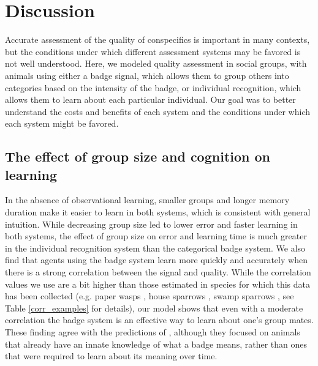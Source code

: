\section*{Discussion}
Accurate assessment of the quality of conspecifics is important in many contexts, but the conditions under which different assessment systems may be favored is not well understood. Here, we modeled quality assessment in social groups, with animals using either a badge signal, which allows them to group others into categories based on the intensity of the badge, or individual recognition, which allows them to learn about each particular individual. Our goal was to better understand the costs and benefits of each system and the conditions under which each system might be favored. 

\subsection*{The effect of group size and cognition on learning} 

In the absence of observational learning, smaller groups and longer memory duration make it easier to learn in both systems, which is consistent with general intuition. While decreasing group size led to lower error and faster learning in both systems, the effect of group size on error and learning time is much greater in the individual recognition system than the categorical badge system. We also find that agents using the badge system learn more quickly and accurately when there is a strong correlation between the signal and quality. While the correlation values we use are a bit higher than those estimated in species for which this data has been collected (e.g. paper wasps \citep{Tibbetts:2004kx}, house sparrows \citep{Veiga:1993fk}, swamp sparrows \citep{Olsen:2010uq}, see Table \ref{corr_examples} for details), our model shows that even with a moderate correlation the badge system is an effective way to learn about one's group mates. These finding agree with the predictions of \citet{sheehan2016evotradeoff}, although they focused on animals that already have an innate knowledge of what a badge means, rather than ones that were required to learn about its meaning over time.


